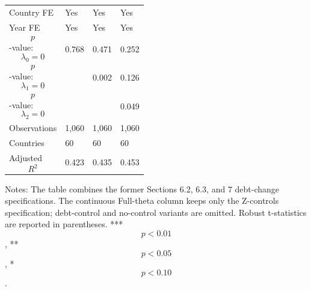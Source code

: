 \begin{table}[H]
\begin{threeparttable}
\begin{tabularx}{\textwidth}{lYYY}
Country FE & Yes & Yes & Yes \\
Year FE & Yes & Yes & Yes \\
$$p$$-value: $$\lambda_0=0$$ & 0.768 & 0.471 & 0.252 \\
$$p$$-value: $$\lambda_1=0$$ &  & 0.002 & 0.126 \\
$$p$$-value: $$\lambda_2=0$$ &  &  & 0.049 \\
Observations & 1,060 & 1,060 & 1,060 \\
Countries & 60 & 60 & 60 \\
Adjusted $$R^2$$ & 0.423 & 0.435 & 0.453 \\
\bottomrule
\end{tabularx}
\begin{tablenotes}[flushleft]\footnotesize
\item Notes: The table combines the former Sections 6.2, 6.3, and 7 debt-change specifications. The continuous Full-theta column keeps only the Z-controls specification; debt-control and no-control variants are omitted. Robust t-statistics are reported in parentheses. *** $$p<0.01$$, ** $$p<0.05$$, * $$p<0.10$$.
\end{tablenotes}
\end{threeparttable}
\end{table}

